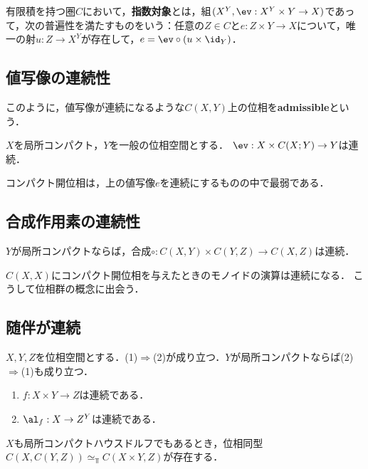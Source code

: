 \documentclass[uplatex,dvipdfmx]{jsreport}
\begin{document}
\begin{definition}
    有限積を持つ圏$C$において，\textbf{指数対象}とは，組$(X^Y,\ev:X^Y\times Y\to X)$であって，次の普遍性を満たすものをいう：任意の$Z\in C$と$e:Z\times Y\to X$について，唯一の射$u:Z\to X^Y$が存在して，$e=\ev\circ (u\times\id_Y)$．
\end{definition}

\subsection{値写像の連続性}

\begin{tcolorbox}[colframe=ForestGreen, colback=ForestGreen!10!white,breakable,colbacktitle=ForestGreen!40!white,coltitle=black,fonttitle=\bfseries\sffamily,
title=]
    このように，値写像が連続になるような$C(X,Y)$上の位相を\textbf{admissible}という．
\end{tcolorbox}

\begin{proposition}
    $X$を局所コンパクト，$Y$を一般の位相空間とする．
    $\ev:X\times C(X;Y)\to Y$は連続．
\end{proposition}

\begin{proposition}
    コンパクト開位相は，上の値写像$e$を連続にするものの中で最弱である．
\end{proposition}

\subsection{合成作用素の連続性}

\begin{proposition}
    $Y$が局所コンパクトならば，合成$\circ:C(X,Y)\times C(Y,Z)\to C(X,Z)$は連続．
\end{proposition}
\begin{remarks}
    $C(X,X)$にコンパクト開位相を与えたときのモノイドの演算は連続になる．
    こうして位相群の概念に出会う．
\end{remarks}

\subsection{随伴が連続}

\begin{proposition}
    $X,Y,Z$を位相空間とする．(1)$\Rightarrow$(2)が成り立つ．$Y$が局所コンパクトならば(2)$\Rightarrow$(1)も成り立つ．
    \begin{enumerate}
        \item $f:X\times Y\to Z$は連続である．
        \item $\al_f:X\to Z^Y$は連続である．
    \end{enumerate}
    $X$も局所コンパクトハウスドルフでもあるとき，位相同型$C(X,C(Y,Z))\simeq_\Top C(X\times Y,Z)$が存在する．
\end{proposition}
\end{document}
